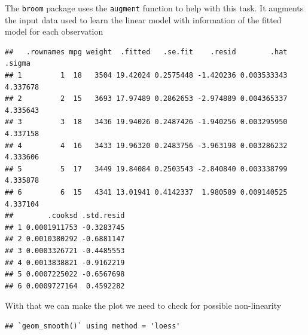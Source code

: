 \documentclass[]{article}
\newenvironment{Shaded}{\begin{snugshade}}{\end{snugshade}}
\newcommand{\KeywordTok}[1]{\textcolor[rgb]{0.13,0.29,0.53}{\textbf{{#1}}}}
\newcommand{\DataTypeTok}[1]{\textcolor[rgb]{0.13,0.29,0.53}{{#1}}}
\newcommand{\StringTok}[1]{\textcolor[rgb]{0.31,0.60,0.02}{{#1}}}
\newcommand{\NormalTok}[1]{{#1}}
\theoremstyle{definition}
\theoremstyle{definition}
\theoremstyle{remark}
\begin{document}
The \texttt{broom} package uses the \texttt{augment} function to help
with this task. It augments the input data used to learn the linear
model with information of the fitted model for each observation

\begin{Shaded}
\end{Shaded}

\begin{verbatim}
##   .rownames mpg weight  .fitted   .se.fit    .resid        .hat   .sigma
## 1         1  18   3504 19.42024 0.2575448 -1.420236 0.003533343 4.337678
## 2         2  15   3693 17.97489 0.2862653 -2.974889 0.004365337 4.335643
## 3         3  18   3436 19.94026 0.2487426 -1.940256 0.003295950 4.337158
## 4         4  16   3433 19.96320 0.2483756 -3.963198 0.003286232 4.333606
## 5         5  17   3449 19.84084 0.2503543 -2.840840 0.003338799 4.335878
## 6         6  15   4341 13.01941 0.4142337  1.980589 0.009140525 4.337104
##        .cooksd .std.resid
## 1 0.0001911753 -0.3283745
## 2 0.0010380292 -0.6881147
## 3 0.0003326721 -0.4485553
## 4 0.0013838821 -0.9162219
## 5 0.0007225022 -0.6567698
## 6 0.0009727164  0.4592282
\end{verbatim}

With that we can make the plot we need to check for possible
non-linearity

\begin{Shaded}
\end{Shaded}

\begin{verbatim}
## `geom_smooth()` using method = 'loess'
\end{verbatim}
\end{document}
